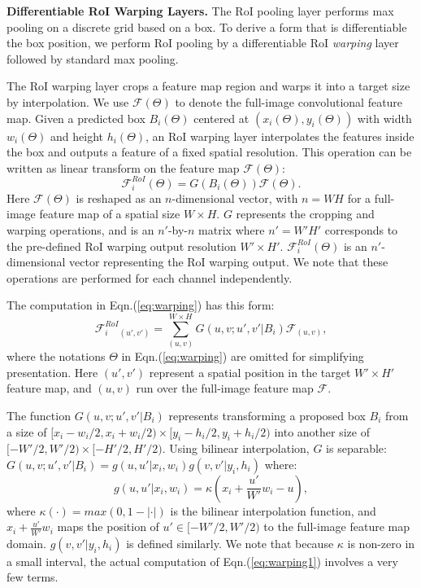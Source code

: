 \documentclass[10pt,twocolumn,letterpaper]{article}
\begin{document}
\vspace{.5em}
\noindent\textbf{Differentiable RoI Warping Layers.}
The RoI pooling layer \cite{Girshick2015,He2014} performs max pooling on a discrete grid based on a box. To derive a form that is differentiable \wrt the box position, we perform RoI pooling by a differentiable RoI \emph{warping} layer followed by standard max pooling.

The RoI warping layer crops a feature map region and warps it into a target size by interpolation.
We use $\mathcal{F}(\Theta)$ to denote the full-image convolutional feature map. Given a predicted box $B_i(\Theta)$ centered at $(x_i(\Theta), y_i(\Theta))$ with width $w_i(\Theta)$ and height $h_i(\Theta)$, an RoI warping layer interpolates the features inside the box and outputs a feature of a fixed spatial resolution. This operation can be written as linear transform on the feature map $\mathcal{F}(\Theta)$:
\begin{equation}\label{eq:warping}
\mathcal{F}^{RoI}_i(\Theta)=G(B_i(\Theta))\mathcal{F}(\Theta).
\end{equation}
Here $\mathcal{F}(\Theta)$ is reshaped as an $n$-dimensional vector, with $n=WH$ for a full-image feature map of a spatial size $W\times H$. $G$ represents the cropping and warping operations, and is an $n'$-by-$n$ matrix where $n'=W'H'$ corresponds to the pre-defined RoI warping output resolution $W'\times H'$.
$\mathcal{F}^{RoI}_i(\Theta)$ is an $n'$-dimensional vector representing the RoI warping output. We note that these operations are performed for each channel independently.

The computation in Eqn.(\ref{eq:warping}) has this form:
\begin{equation}\label{eq:warping1}
\mathcal{F}^{RoI}_i{_{(u', v')}}=\sum^{W\times H }_{(u,v)}G(u, v; u', v' | B_i)\mathcal{F}_{(u, v)},
\end{equation}
where the notations $\Theta$ in Eqn.(\ref{eq:warping}) are omitted for simplifying presentation. Here $(u', v')$ represent a spatial position in the target $W'\times H'$ feature map, and $(u, v)$ run over the full-image feature map $\mathcal{F}$.

The function $G(u, v; u', v' | B_i)$ represents transforming a proposed box $B_i$ from a size of $[x_i-w_i/2, x_i+w_i/2)\times[y_i-h_i/2, y_i+h_i/2)$ into another size of $[-W'/2, W'/2)\times[-H'/2, H'/2)$. Using bilinear interpolation, $G$ is separable: $G(u, v; u', v' | B_i)=g(u, u' | x_i, w_i)g(v, v' | y_i, h_i)$ where:
\vspace{-.5em}
\begin{equation}
g(u, u' | x_i, w_i) = \kappa(x_i+\frac{u'}{W'}w_i-u),
\label{eq:warping2}
\end{equation}
where $\kappa(\cdot)=max(0, 1-|\cdot|)$ is the bilinear interpolation function, and $x_i+\frac{u'}{W'}w_i$ maps the position of $u'\in[-W'/2, W'/2)$ to the full-image feature map domain.
$g(v, v' | y_i, h_i)$ is defined similarly. We note that because $\kappa$ is non-zero in a small interval, the actual computation of Eqn.(\ref{eq:warping1}) involves a very few terms.
\end{document}
